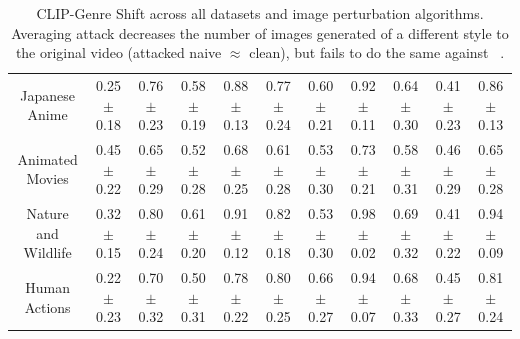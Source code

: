 \begin{table}[t]
{\begin{tabular}{ccccccccccc}
\multicolumn{1}{c|}{Japanese Anime}      & \multicolumn{1}{c|}{0.25 $\pm$ 0.18} & 0.76 $\pm$ 0.23 & 0.58 $\pm$ 0.19                                          & \multicolumn{1}{c|}{0.88 $\pm$ 0.13}                                                    & 0.77 $\pm$ 0.24 & 0.60 $\pm$ 0.21                                          & \multicolumn{1}{c|}{0.92 $\pm$ 0.11}                                                    & 0.64 $\pm$ 0.30 & 0.41 $\pm$ 0.23                                          & 0.86 $\pm$ 0.13                                                    \\
\multicolumn{1}{c|}{Animated Movies}     & \multicolumn{1}{c|}{0.45 $\pm$ 0.22} & 0.65 $\pm$ 0.29 & 0.52 $\pm$ 0.28                                          & \multicolumn{1}{c|}{0.68 $\pm$ 0.25}                                                    & 0.61 $\pm$ 0.28 & 0.53 $\pm$ 0.30                                          & \multicolumn{1}{c|}{0.73 $\pm$ 0.21}                                                    & 0.58 $\pm$ 0.31 & 0.46 $\pm$ 0.29                                          & 0.65 $\pm$ 0.28                                                    \\
\multicolumn{1}{c|}{Nature and Wildlife} & \multicolumn{1}{c|}{0.32 $\pm$ 0.15} & 0.80 $\pm$ 0.24 & 0.61 $\pm$ 0.20                                          & \multicolumn{1}{c|}{0.91 $\pm$ 0.12}                                                    & 0.82 $\pm$ 0.18 & 0.53 $\pm$ 0.30                                          & \multicolumn{1}{c|}{0.98 $\pm$ 0.02}                                                    & 0.69 $\pm$ 0.32 & 0.41 $\pm$ 0.22                                          & 0.94 $\pm$ 0.09                                                    \\
\multicolumn{1}{c|}{Human Actions}       & \multicolumn{1}{c|}{0.22 $\pm$ 0.23} & 0.70 $\pm$ 0.32 & 0.50 $\pm$ 0.31                                          & \multicolumn{1}{c|}{0.78 $\pm$ 0.22}                                                    & 0.80 $\pm$ 0.25 & 0.66 $\pm$ 0.27                                          & \multicolumn{1}{c|}{0.94 $\pm$ 0.07}                                                    & 0.68 $\pm$ 0.33 & 0.45 $\pm$ 0.27                                          & 0.81 $\pm$ 0.24                                                   
\end{tabular}
  }
  \caption{CLIP-Genre Shift across all datasets and image perturbation algorithms. Averaging attack decreases the number of images generated of a different style to the original video (attacked naive $\approx$ clean), but fails to do the same against \system~.}
    \label{table:adv-algorithm-style-mimicry}
\end{table}

